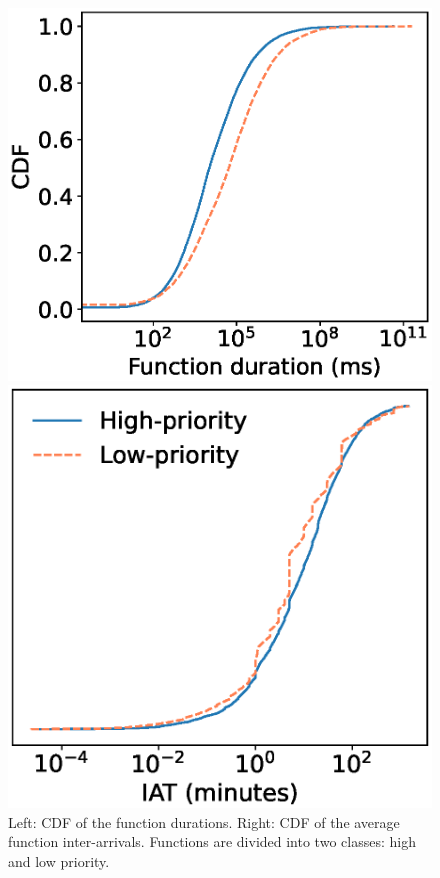 \begin{figure}[t]
    \centering
    \begin{minipage}{0.49\linewidth}\vspace{0pt}%
        \includegraphics[width=\linewidth]{chrlu/qos/Figures/CDF-functionDurationsByPriority.eps}
    \end{minipage}
    \begin{minipage}{0.48\linewidth}\vspace{-5pt}%
        \includegraphics[width=0.95\linewidth]{chrlu/qos/Figures/CDF-averageInterarrivals.eps}
    \end{minipage}
    \caption{Left: CDF of the function durations. Right: CDF of the average function inter-arrivals. Functions are divided into two classes: high and low priority.}
    \label{fig:CDF:workload}
\end{figure}



